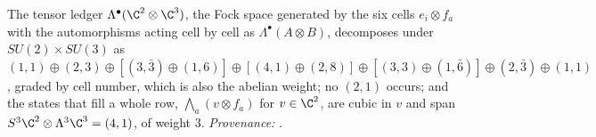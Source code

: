 The tensor ledger $\Lambda^{\bullet}(\C^{2} \otimes \C^{3})$, the Fock space generated by the six cells $e_{i} \otimes f_{a}$ with the automorphisms acting cell by cell as $\Lambda^{\bullet}(A \otimes B)$, decomposes under $SU(2) \times SU(3)$ as $(1,1) \oplus (2,3) \oplus [(3,\bar{3}) \oplus (1,6)] \oplus [(4,1) \oplus (2,8)] \oplus [(3,3) \oplus (1,\bar{6})] \oplus (2,\bar{3}) \oplus (1,1)$, graded by cell number, which is also the abelian weight; no $(2,1)$ occurs; and the states that fill a whole row, $\bigwedge_{a}(v \otimes f_{a})$ for $v \in \C^{2}$, are cubic in $v$ and span $S^{3}\C^{2} \otimes \Lambda^{3}\C^{3} = (4,1)$, of weight $3$. \emph{Provenance:} \cite[Prop.~5.1 and Prop.~5.3(2)]{ButlerT12}.
